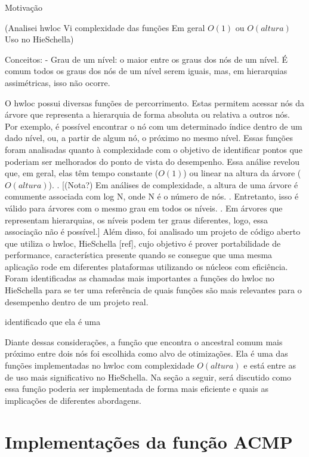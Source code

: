 \documentclass{ufsc-thesis}
\begin{document}

Motivação

(Analisei hwloc
Vi complexidade das funções
Em geral $O(1)$ ou $O(altura)$
Uso no HieSchella)

Conceitos:
- Grau de um nível: o maior entre os graus dos nós de um nível.
É comum todos os graus dos nós de um nível serem iguais, mas, em hierarquias assimétricas, isso não ocorre.

O hwloc possui diversas funções de percorrimento.
Estas permitem acessar nós da árvore que representa a hierarquia de forma absoluta ou relativa a outros nós.
Por exemplo, é possível encontrar o nó com um determinado índice dentro de um dado nível,
ou, a partir de algum nó, o próximo no mesmo nível.
Essas funções foram analisadas quanto à complexidade com o objetivo de identificar pontos que poderiam ser melhorados do ponto de vista do desempenho.
Essa análise revelou que, em geral, elas têm tempo constante ($O(1)$) ou linear na altura da árvore ($O(altura)$).
. [(Nota?) Em análises de complexidade, a altura de uma árvore é comumente associada com log N, onde N é o número de nós.
. Entretanto, isso é válido para árvores com o mesmo grau em todos os níveis.
. Em árvores que representam hierarquias, os níveis podem ter graus diferentes, logo, essa associação não é possível.]
Além disso, foi analisado um projeto de código aberto que utiliza o hwloc, HieSchella [ref],
cujo objetivo é prover portabilidade de performance, característica presente quando se consegue que
uma mesma aplicação rode em diferentes plataformas utilizando os núcleos com eficiência.
Foram identificadas as chamadas mais importantes a funções do hwloc no HieSchella para se ter uma referência
de quais funções são mais relevantes para o desempenho dentro de um projeto real.

identificado que ela é uma

Diante dessas considerações, a função que encontra o ancestral comum mais próximo entre dois nós foi escolhida como alvo de otimizações.
Ela é uma das funções implementadas no hwloc com complexidade $O(altura)$ e está entre as de uso mais significativo no HieSchella.
Na seção a seguir, será discutido como essa função poderia ser implementada de forma mais eficiente e quais as implicações de diferentes abordagens.


\section{Implementações da função ACMP}
\end{document}
